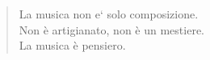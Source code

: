 \newpage %


\begin{quote}
La musica non e` solo composizione. \\
Non è artigianato, non è un mestiere. \\
La musica è pensiero. \cite{nono85}
\end{quote}





%

%

\vfill\null

\raggedright

\printbibliography




